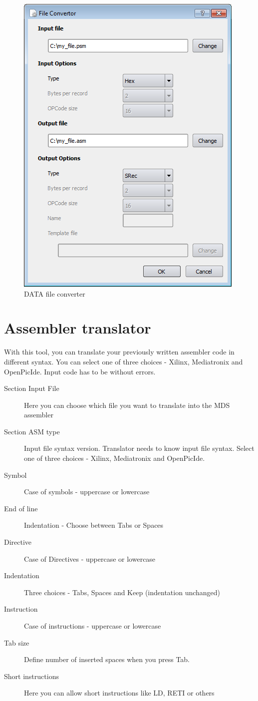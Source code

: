     \begin{figure}[h]
        \centering
        \includegraphics[width=.5\textwidth]{img/DATA_converter.png}
        \caption{DATA file converter}
    \end{figure}

\clearpage
\section{Assembler translator}
    With this tool, you can translate your previously written assembler code in different syntax.
    You can select one of three choices - Xilinx, Mediatronix and OpenPicIde. Input code has to be without
    errors.
    \begin{description}
        \item[Section Input File] Here you can choose which file you want to translate into the MDS assembler
        \item[Section ASM type] Input file syntax version. Translator needs to know input file syntax. Select one of
             three choices - Xilinx, Mediatronix and OpenPicIde.
        \item[Symbol] Case of symbols - uppercase or lowercase
        \item[End of line] Indentation - Choose between Tabs or Spaces
        \item[Directive] Case of Directives - uppercase or lowercase
        \item[Indentation] Three choices - Tabs, Spaces and Keep (indentation unchanged)
        \item[Instruction] Case of instructions - uppercase or lowercase
        \item[Tab size]  Define number of inserted spaces when you press Tab.
        \item[Short instructions] Here you can allow short instructions like LD, RETI or others
    \end{description}

